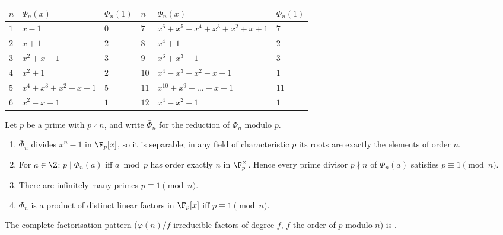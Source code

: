 \begin{center}
\small
\begin{tabular}{lll@{\qquad}lll}
\toprule
$n$ & $\Phi_n(x)$ & $\Phi_n(1)$ & $n$ & $\Phi_n(x)$ & $\Phi_n(1)$\\
\midrule
$1$ & $x-1$ & $0$ & $7$ & $x^6+x^5+x^4+x^3+x^2+x+1$ & $7$\\
$2$ & $x+1$ & $2$ & $8$ & $x^4+1$ & $2$\\
$3$ & $x^2+x+1$ & $3$ & $9$ & $x^6+x^3+1$ & $3$\\
$4$ & $x^2+1$ & $2$ & $10$ & $x^4-x^3+x^2-x+1$ & $1$\\
$5$ & $x^4+x^3+x^2+x+1$ & $5$ & $11$ & $x^{10}+x^9+\dots+x+1$ & $11$\\
$6$ & $x^2-x+1$ & $1$ & $12$ & $x^4-x^2+1$ & $1$\\
\bottomrule
\end{tabular}
\end{center}

\begin{proposition}\label{prop:rings:cyclotomic-mod-p}
Let $p$ be a prime with $p\nmid n$, and write $\bar\Phi_n$ for the reduction of $\Phi_n$ modulo $p$.
\begin{enumerate}[label=(\roman*)]
\item $\bar\Phi_n$ divides $x^n-1$ in $\F_p[x]$, so it is separable; in any field of characteristic $p$ its roots are exactly the elements of
order $n$.
\item For $a\in\Z$: $p\mid\Phi_n(a)$ iff $a\bmod p$ has order exactly $n$ in $\F_p^\times$. Hence every prime divisor $p\nmid n$ of $\Phi_n(a)$ satisfies
$p\equiv1\pmod n$.
\item There are infinitely many primes $p\equiv1\pmod n$.
\item $\bar\Phi_n$ is a product of distinct linear factors in $\F_p[x]$ iff $p\equiv1\pmod n$.
\end{enumerate}
The complete factorisation pattern ($\varphi(n)/f$ irreducible factors of degree $f$, $f$ the order of $p$ modulo $n$) is .
\end{proposition}

